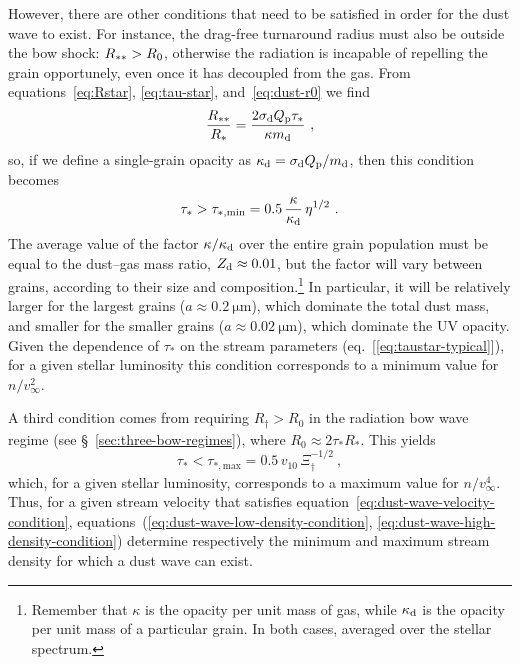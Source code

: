 However, there are other conditions that need to be satisfied in order
for the dust wave to exist.  For instance, the drag-free turnaround
radius must also be outside the bow shock: \(R_{**} > R_0\),
otherwise the radiation is incapable of repelling the grain
opportunely, even once it has decoupled from the gas.  From
equations~\eqref{eq:Rstar}, \eqref{eq:tau-star},
and~\eqref{eq:dust-r0} we find
\begin{equation}
  \label{eq:Rstarstar-over-Rstar}
  \frac{R_{**}}{R_*} = \frac{2 \sigma_{\text{d}} Q_{\text{p}} \tau_*}{\kappa m_{\text{d}}} \ , 
\end{equation}
so, if we define a single-grain opacity as
\(\kappa_{\text{d}} = \sigma_{\text{d}} Q_{\text{p}} / m_{\text{d}}\), then this condition becomes
\begin{equation}
  \label{eq:dust-wave-low-density-condition}
  \tau_* >  \tau_{*,\text{min}} = 0.5\, \frac{\kappa}{\kappa_{\text{d}}}\, \eta^{1/2} 
  \ . 
\end{equation}
The average value of the factor \(\kappa / \kappa_{\text{d}}\) over the entire grain
population must be equal to the dust--gas mass ratio,
\(Z_{\text{d}} \approx 0.01\), but the factor will vary between grains, according
to their size and composition.\footnote{%
  Remember that \(\kappa\) is the opacity per unit mass of gas, while
  \(\kappa_{\text{d}}\) is the opacity per unit mass of a particular grain. In
  both cases, averaged over the stellar spectrum.} %
In particular, it will be relatively larger for the largest grains
(\(a \approx \SI{0.2}{\um}\)), which dominate the total dust mass, and
smaller for the smaller grains (\(a \approx \SI{0.02}{\um}\)), which
dominate the UV opacity.  Given the dependence of \(\tau_*\) on the
stream parameters (eq.~[\ref{eq:taustar-typical}]), for a given
stellar luminosity this condition corresponds to a minimum value for
\(n / v_\infty^2\).

A third condition comes from requiring \(R_\dag > R_0\) in the radiation
bow wave regime (see \S~\ref{sec:three-bow-regimes}), where
\(R_0 \approx 2 \tau_* R_*\).  This yields
\begin{equation}
  \label{eq:dust-wave-high-density-condition}
  \tau_* < \tau_{*,\text{max}} = 0.5\, v_{10}\, \Xi_\dag^{-1/2} \ , 
\end{equation}
which, for a given stellar luminosity, corresponds to a maximum value
for \(n / v_\infty^4\).  Thus, for a given stream velocity that satisfies
equation~\eqref{eq:dust-wave-velocity-condition},
equations~(\ref{eq:dust-wave-low-density-condition},
\ref{eq:dust-wave-high-density-condition}) determine respectively the
minimum and maximum stream density for which a dust wave can exist.

